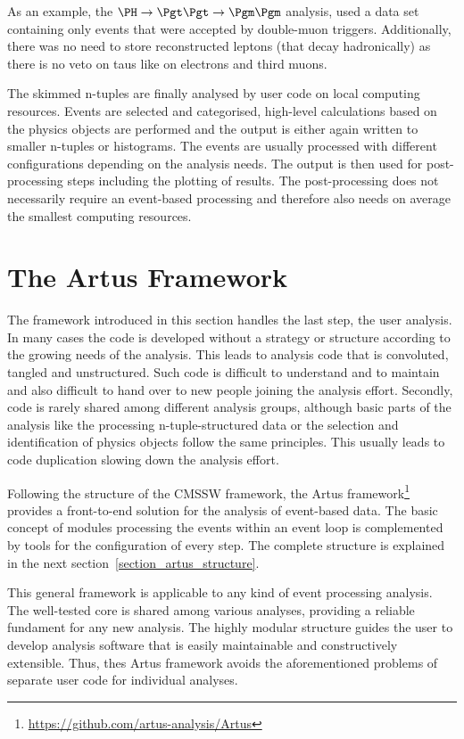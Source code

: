 \documentclass[3p]{elsarticle}
\begin{document}
As an example, the $\PH\to\Pgt\Pgt\to\Pgm\Pgm$ analysis, used a data set containing only events that were accepted by double-muon triggers. Additionally, there was no need to store reconstructed \Pgt leptons (that decay hadronically) as there is no veto on taus like on electrons and third muons.

The skimmed n-tuples are finally analysed by user code on local computing resources. Events are selected and categorised, high-level calculations based on the physics objects are performed and the output is either again written to smaller n-tuples or histograms. The events are usually processed with different configurations depending on the analysis needs. The output is then used for post-processing steps including the plotting of results. The post-processing does not necessarily require an event-based processing and therefore also needs on average the smallest computing resources.


\section{The Artus Framework \label{section_artus_motivation}}

The framework introduced in this section handles the last step, the user analysis. In many cases the code is developed without a strategy or structure according to the growing needs of the analysis. This leads to analysis code that is convoluted, tangled and unstructured. Such code is difficult to understand and to maintain and also difficult to hand over to new people joining the analysis effort. Secondly, code is rarely shared among different analysis groups, although basic parts of the analysis like the processing n-tuple-structured data or the selection and identification of physics objects follow the same principles. This usually leads to code duplication slowing down the analysis effort.

Following the structure of the CMSSW framework, the Artus framework\footnote{\url{https://github.com/artus-analysis/Artus}} provides a front-to-end solution for the analysis of event-based data. The basic concept of modules processing the events within an event loop is complemented by tools for the configuration of every step. The complete structure is explained in the next section~\ref{section_artus_structure}.

This general framework is applicable to any kind of event processing analysis. The well-tested core is shared among various analyses, providing a reliable fundament for any new analysis. The highly modular structure guides the user to develop analysis software that is easily maintainable and constructively extensible. Thus, thes Artus framework avoids the aforementioned problems of separate user code for individual analyses.
\end{document}
